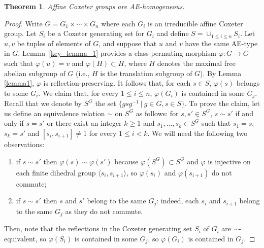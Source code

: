 \documentclass[a4paper, 11pt]{amsart}
\newtheorem{te}{Theorem}[section]
\theoremstyle{definition}
\theoremstyle{remark}
\renewcommand{\leq}{\leqslant}
\renewcommand{\geq}{\geqslant}
\begin{document}
\begin{te}\label{main_affine_homogeneous}
Affine Coxeter groups are AE-homogeneous.    
\end{te}

\begin{proof}
Write $G=G_1\times \cdots\times G_n$ where each $G_i$ is an irreducible affine Coxeter group. Let $S_i$ be a Coxeter generating set for $G_i$ and define $S=\cup_{1\leq i\leq n}S_i$. Let $u,v$ be tuples of elements of $G$, and suppose that $u$ and $v$ have the same AE-type in $G$. Lemma~\ref{key_lemma_1} provides a class-permuting morphism $\varphi : G\rightarrow G$ such that $\varphi(u)=v$ and $\varphi(H)\subset H$, where $H$ denotes the maximal free abelian subgroup of $G$ (i.e., $H$ is the translation subgroup of $G$). By Lemma \ref{lemma1}, $\varphi$ is reflection-preserving. It follows that, for each $s\in S$, $\varphi(s)$ belongs to some $G_i$. We claim that, for every $1\leq i\leq n$, $\varphi(G_i)$ is contained in some $G_j$. Recall that we denote by $S^G$ the set $\lbrace gsg^{-1} \ \vert \ g\in G, s\in S\rbrace$. To prove the claim, let us define an equivalence relation $\sim$ on $S^G$ as follows: for $s,s'\in S^G$, $s\sim s'$ if and only if $s=s'$ or there exist an integer $k\geq 1$ and $s_1,\ldots,s_k\in S^G$ such that $s_1=s$, $s_k=s'$ and $[s_i,s_{i+1}]\neq 1$ for every $1\leq i <k$. We will need the following two observations:
\begin{enumerate}[(1)]
    \item if $s\sim s'$ then $\varphi(s)\sim \varphi(s')$ because $\varphi(S^G)\subset S^G$ and $\varphi$ is injective on each finite dihedral group $\langle s_i,s_{i+1}\rangle$, so $\varphi(s_i)$ and $\varphi(s_{i+1})$ do not commute;
    \item if $s\sim s'$ then $s$ and $s'$ belong to the same $G_j$: indeed, each $s_i$ and $s_{i+1}$ belong to the same $G_j$ as they do not commute.
\end{enumerate}
Then, note that the reflections in the Coxeter generating set $S_i$ of $G_i$ are $\sim$-equivalent, so $\varphi(S_i)$ is contained in some $G_j$, so $\varphi(G_i)$ is contained in $G_j$.




\end{proof}
\end{document}

